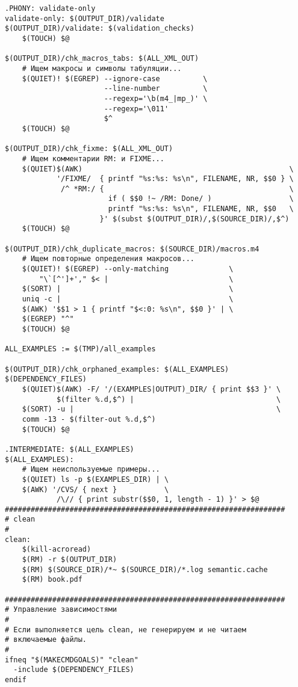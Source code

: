 \begin{verbatim}
.PHONY: validate-only
validate-only: $(OUTPUT_DIR)/validate
$(OUTPUT_DIR)/validate: $(validation_checks)
    $(TOUCH) $@

$(OUTPUT_DIR)/chk_macros_tabs: $(ALL_XML_OUT)
    # Ищем макросы и символы табуляции...
    $(QUIET)! $(EGREP) --ignore-case          \
                       --line-number          \
                       --regexp='\b(m4_|mp_)' \
                       --regexp='\011'
                       $^
    $(TOUCH) $@

$(OUTPUT_DIR)/chk_fixme: $(ALL_XML_OUT)
    # Ищем комментарии RM: и FIXME...
    $(QUIET)$(AWK)                                                \
            '/FIXME/  { printf "%s:%s: %s\n", FILENAME, NR, $$0 } \
             /^ *RM:/ {                                           \
                        if ( $$0 !~ /RM: Done/ )                  \
                        printf "%s:%s: %s\n", FILENAME, NR, $$0   \
                      }' $(subst $(OUTPUT_DIR)/,$(SOURCE_DIR)/,$^) 
    $(TOUCH) $@ 

$(OUTPUT_DIR)/chk_duplicate_macros: $(SOURCE_DIR)/macros.m4
    # Ищем повторные определения макросов...
    $(QUIET)! $(EGREP) --only-matching              \
        "\`[^']+'," $< |                            \
    $(SORT) |                                       \
    uniq -c |                                       \
    $(AWK) '$$1 > 1 { printf "$<:0: %s\n", $$0 }' | \
    $(EGREP) "^"
    $(TOUCH) $@

ALL_EXAMPLES := $(TMP)/all_examples

$(OUTPUT_DIR)/chk_orphaned_examples: $(ALL_EXAMPLES) $(DEPENDENCY_FILES)
    $(QUIET)$(AWK) -F/ '/(EXAMPLES|OUTPUT)_DIR/ { print $$3 }' \
            $(filter %.d,$^) |                                 \
    $(SORT) -u |                                               \
    comm -13 - $(filter-out %.d,$^)
    $(TOUCH) $@

.INTERMEDIATE: $(ALL_EXAMPLES)
$(ALL_EXAMPLES):
    # Ищем неиспользуемые примеры...
    $(QUIET) ls -p $(EXAMPLES_DIR) | \
    $(AWK) '/CVS/ { next }           \
            /\// { print substr($$0, 1, length - 1) }' > $@
#################################################################
# clean
#
clean:
    $(kill-acroread)
    $(RM) -r $(OUTPUT_DIR)
    $(RM) $(SOURCE_DIR)/*~ $(SOURCE_DIR)/*.log semantic.cache
    $(RM) book.pdf

#################################################################
# Управление зависимостями
#
# Если выполняется цель clean, не генерируем и не читаем
# включаемые файлы.
#
ifneq "$(MAKECMDGOALS)" "clean"
  -include $(DEPENDENCY_FILES)
endif


\end{verbatim}

